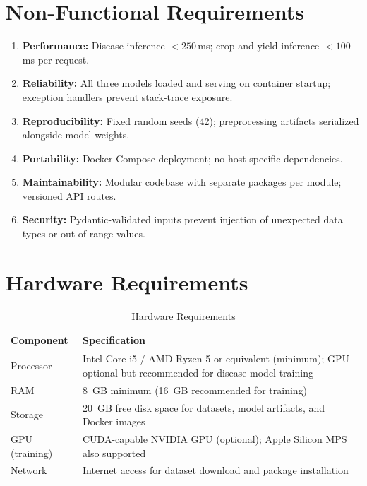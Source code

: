 \documentclass[12pt,a4paper]{report}
\begin{document}
\section{Non-Functional Requirements}
\begin{enumerate}[leftmargin=*]
  \item \textbf{Performance:} Disease inference $<250$\,ms; crop and yield inference $<100$\,ms per request.
  \item \textbf{Reliability:} All three models loaded and serving on container startup; exception handlers prevent stack-trace exposure.
  \item \textbf{Reproducibility:} Fixed random seeds (42); preprocessing artifacts serialized alongside model weights.
  \item \textbf{Portability:} Docker Compose deployment; no host-specific dependencies.
  \item \textbf{Maintainability:} Modular codebase with separate packages per module; versioned API routes.
  \item \textbf{Security:} Pydantic-validated inputs prevent injection of unexpected data types or out-of-range values.
\end{enumerate}

\section{Hardware Requirements}
\begin{table}[h!]
\centering
\renewcommand{\arraystretch}{1.3}
\caption{Hardware Requirements}
\label{tab:hw_req}
\begin{tabular}{|L{4cm}|L{9cm}|}
\hline
\textbf{Component} & \textbf{Specification} \\
\hline
Processor & Intel Core i5 / AMD Ryzen 5 or equivalent (minimum); GPU optional but recommended for disease model training \\
\hline
RAM & 8~GB minimum (16~GB recommended for training) \\
\hline
Storage & 20~GB free disk space for datasets, model artifacts, and Docker images \\
\hline
GPU (training) & CUDA-capable NVIDIA GPU (optional); Apple Silicon MPS also supported \\
\hline
Network & Internet access for dataset download and package installation \\
\hline
\end{tabular}
\end{table}
\end{document}
